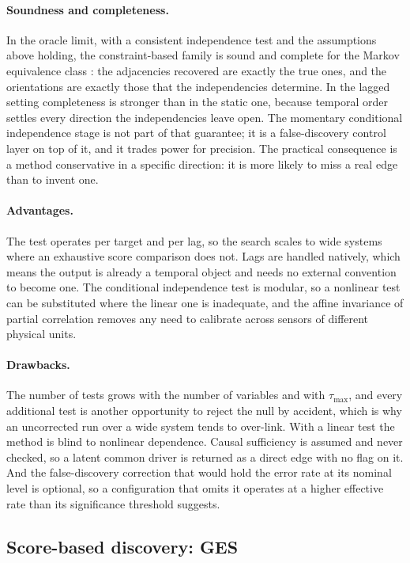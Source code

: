 \paragraph{Soundness and completeness.} In the oracle limit, with a consistent independence test and the assumptions above holding, the constraint-based family is sound and complete for the Markov equivalence class \cite{spirtes2000causation}: the adjacencies recovered are exactly the true ones, and the orientations are exactly those that the independencies determine. In the lagged setting completeness is stronger than in the static one, because temporal order settles every direction the independencies leave open. The momentary conditional independence stage is not part of that guarantee; it is a false-discovery control layer on top of it, and it trades power for precision. The practical consequence is a method conservative in a specific direction: it is more likely to miss a real edge than to invent one.

\paragraph{Advantages.} The test operates per target and per lag, so the search scales to wide systems where an exhaustive score comparison does not. Lags are handled natively, which means the output is already a temporal object and needs no external convention to become one. The conditional independence test is modular, so a nonlinear test can be substituted where the linear one is inadequate, and the affine invariance of partial correlation removes any need to calibrate across sensors of different physical units.

\paragraph{Drawbacks.} The number of tests grows with the number of variables and with $\tau_{\max}$, and every additional test is another opportunity to reject the null by accident, which is why an uncorrected run over a wide system tends to over-link. With a linear test the method is blind to nonlinear dependence. Causal sufficiency is assumed and never checked, so a latent common driver is returned as a direct edge with no flag on it. And the false-discovery correction that would hold the error rate at its nominal level is optional, so a configuration that omits it operates at a higher effective rate than its significance threshold suggests.

\subsection{Score-based discovery: GES}
\label{sec:bg-ges}

